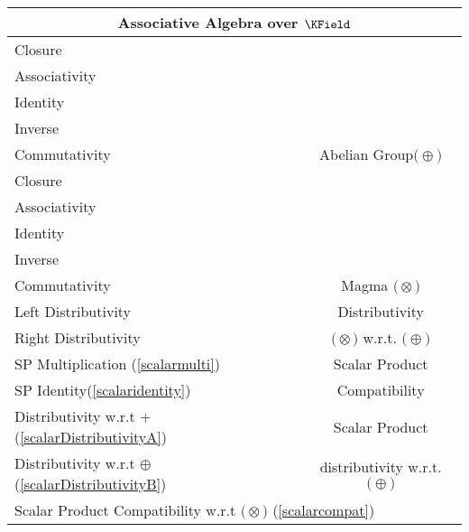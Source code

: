 \documentclass[a4paper,12pt]{scrartcl}    %
\newcommand{\OpA}{\otimes}
\newcommand{\OpB}{\oplus}
\begin{document}
\begin{minipage}[c]{0,5\textwidth}
\vspace{0.6cm}
\begin{tabular}{|l|c|} %
  \hline
  \multicolumn{2}{c}{\cellcolor{green!25}Associative Algebra over $\KField$} \\
  \hline
    \cellcolor{blue!25} \footnotesize Closure& \cellcolor{yellow!25}  \\
    \cellcolor{blue!25} \footnotesize Associativity& \cellcolor{yellow!25}  \\
    \cellcolor{blue!25} \footnotesize Identity& \cellcolor{yellow!25} \\
    \cellcolor{blue!25} \footnotesize Inverse& \cellcolor{yellow!25} \\
    \cellcolor{blue!25} \footnotesize Commutativity& \multirow{-5}{*}{\tiny\cellcolor{yellow!25}Abelian Group$\big(\OpB\big)$} \\
   \hline
    \cellcolor{blue!25} \footnotesize Closure& \cellcolor{yellow!25}  \\
    \cellcolor{blue!25} \footnotesize Associativity& \cellcolor{yellow!25}  \\
    \cellcolor{red!25} \footnotesize Identity& \cellcolor{yellow!25} \\
    \cellcolor{red!25} \footnotesize Inverse& \cellcolor{yellow!25} \\
    \cellcolor{red!25} \footnotesize Commutativity& \multirow{-5}{*}{\tiny\cellcolor{yellow!25} Magma $\big(\OpA\big)$} \\
  \hline
  	\cellcolor{blue!25} \footnotesize Left Distributivity&  \tiny\cellcolor{yellow!25}Distributivity\\
    \cellcolor{blue!25} \footnotesize Right Distributivity & \tiny\cellcolor{yellow!25} $\big(\OpA\big)$ w.r.t. $\big(\OpB\big)$  \\
   \hline
  \hline
     \cellcolor{blue!25} \footnotesize SP Multiplication (\ref{scalarmulti})&  \tiny\cellcolor{yellow!25}Scalar Product\\
    \cellcolor{blue!25} \footnotesize SP Identity(\ref{scalaridentity}) & \tiny\cellcolor{yellow!25} Compatibility  \\
   \hline 
    \cellcolor{blue!25} \footnotesize Distributivity w.r.t $+$ (\ref{scalarDistributivityA})&  \tiny\cellcolor{yellow!25}Scalar Product\\
    \cellcolor{blue!25} \footnotesize Distributivity w.r.t $\OpB$ (\ref{scalarDistributivityB}) & \tiny\cellcolor{yellow!25} distributivity w.r.t. $\big(\OpB\big)$  \\
   \hline
    \multicolumn{2}{l}{\footnotesize \cellcolor{blue!25} Scalar Product Compatibility w.r.t  $\big(\OpA\big)$ (\ref{scalarcompat})}\\
   \hline
\end{tabular}

\end{minipage}
\end{document}
